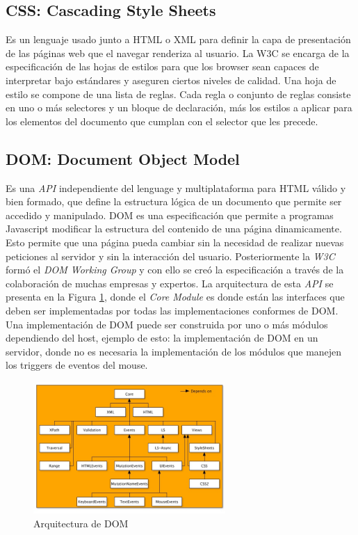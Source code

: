     \subsection{CSS: Cascading Style Sheets}
    \label{chap2:css}
    Es un lenguaje usado junto a HTML o XML para definir la capa de presentación de las páginas web que el navegar renderiza al usuario. La W3C se encarga de la especificación de las hojas de estilos para que los browser sean capaces de interpretar bajo estándares y aseguren ciertos niveles de calidad. Una hoja de estilo se compone de una lista de reglas. Cada regla o conjunto de reglas consiste en uno o más selectores y un bloque de declaración, más los estilos a aplicar para los elementos del documento que cumplan con el selector que les precede. 


    \subsection{DOM: Document Object Model}
    \label{chap2:DOM}
    Es una \textit{API} independiente del lenguage y multiplataforma para HTML válido y bien formado, que define la estructura lógica de un documento que permite ser accedido y manipulado. DOM es una especificación que permite a programas Javascript modificar la estructura del contenido de una página dinamicamente. Esto permite que una página pueda cambiar sin la necesidad de realizar nuevas peticiones al servidor y sin la interacción del usuario. Posteriormente la \textit{W3C} \cite{w3c} formó el \textit{DOM Working Group} y con ello se creó la especificación a través de la colaboración de muchas empresas y expertos. La arquitectura de esta \textit{API} se presenta en la Figura \ref{fig:DOM}, donde el \textit{Core Module} es donde están las interfaces que deben ser implementadas por todas las implementaciones conformes de DOM. Una implementación de DOM puede ser construida por uno o más módulos dependiendo del host, ejemplo de esto: la implementación de DOM en un servidor, donde no es necesaria la implementación de los módulos que manejen los triggers de eventos del mouse.
            
    \begin{figure}[h]
        \centering
        \includegraphics[width=0.65\textwidth]{figures/dom-architecture.jpg}
        \caption{Arquitectura de DOM \cite{w3c}}
        \label{fig:DOM}
    \end{figure}
            
